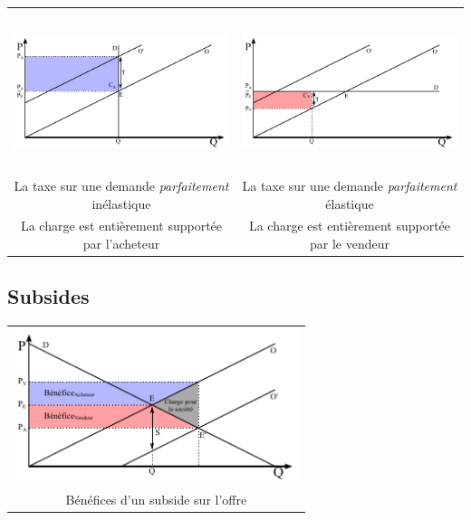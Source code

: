 \begin{center}
\begin{tabular}{cc}
		\rule[-0.9cm]{0cm}{0.5cm}\\
		
		\includegraphics[height=4.5cm]{images/graph_taxe_demande_parfaitement_inelastique.pdf} & \includegraphics[height=4.5cm]{images/graph_taxe_demande_parfaitement_elastique.pdf}\\
		La taxe sur une demande \textit{parfaitement} inélastique                              & La taxe sur une demande \textit{parfaitement} élastique\\
		La charge est entièrement supportée par l'acheteur                                   & La charge est entièrement supportée par le vendeur\\
	\end{tabular}
\end{center}



\subsection{Subsides}



\begin{center}
	\begin{tabular}{c}
		\includegraphics[height=4.5cm]{images/graph_subside_offre.pdf}\\
		Bénéfices d'un subside sur l'offre\\
	\end{tabular}
\end{center}


